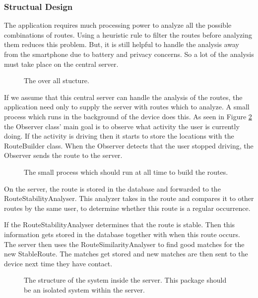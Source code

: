 \subsubsection{Structual Design}
The application requires much processing power to analyze all the possible combinations of routes.
Using a heuristic rule to filter the routes before analyzing them reduces this problem.
But, it is still helpful to handle the analysis away from the smartphone due to battery and privacy concerns.
So a lot of the analysis must take place on the central server.

\begin{figure}[h]
	\centering
	
	\caption{The over all stucture.}
	\label{fig:packageDiagramSprint1}
\end{figure}

If we assume that this central server can handle the analysis of the routes, the application need only to supply the server with routes which to analyze.
A small process which runs in the background of the device does this.
As seen in Figure \ref{fig:classDiagramSprint1Observer} the Observer class' main goal is to observe what activity the user is currently doing.
If the activity is driving then it starts to store the locations with the RouteBuilder class.
When the Observer detects that the user stopped driving, the Observer sends the route to the server.

\begin{figure}[h]
	\centering
	
	\caption{The small process which should run at all time to build the routes.}
	\label{fig:classDiagramSprint1Observer}
\end{figure}

On the server, the route is stored in the database and forwarded to the RouteStabilityAnalyser.
This analyzer takes in the route and compares it to other routes by the same user, to determine whether this route is a regular occurrence.

If the RouteStabilityAnalyser determines that the route is stable.
Then this information gets stored in the database together with when this route occurs.
The server then uses the RouteSimilarityAnalyser to find good matches for the new StableRoute.
The matches get stored and new matches are then sent to the device next time they have contact.

\begin{figure}[h]
	\centering
	
	\caption{The structure of the system inside the server. This package should be an isolated system within the server.}
	\label{fig:classDiagramSprint1Server}
\end{figure}

